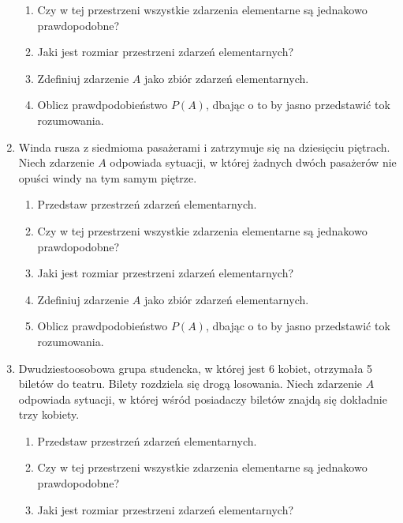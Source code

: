 \documentclass[twoside]{mwart}
\newcommand{\ans}[1]{}
\newcommand{\ans}[1]{\par\emph{Odpowiedź:} #1}
\begin{document}
\begin{enumerate}
\begin{enumerate}
\item Czy w tej przestrzeni wszystkie zdarzenia elementarne są jednakowo prawdopodobne? \ans{Tak}%
\item Jaki jest rozmiar przestrzeni zdarzeń elementarnych? \ans{$\left|\Omega\right|={100\choose 50}$}%
\item Zdefiniuj zdarzenie $A$ jako zbiór zdarzeń elementarnych. \ans{$A=\{\omega_J|\left|J\cap \{1,2,\ldots,5\}\right|\leq 1\}$}%
\item Oblicz prawdpodobieństwo $P(A)$, dbając o to by jasno przedstawić tok rozumowania. \ans{$\left|A\right|={5\choose 1}{95\choose 49}+{95\choose 50}, P(A)\approx0{,}181$}%
\end{enumerate}%
\item Winda rusza z siedmioma pasażerami i zatrzymuje się na dziesięciu piętrach. Niech zdarzenie $A$ odpowiada sytuacji, w której żadnych dwóch pasażerów nie opuści windy na tym samym piętrze.
\begin{enumerate}%
\item Przedstaw przestrzeń zdarzeń elementarnych. \ans{$\Omega=\{\omega_{i_1,\ldots,i_7}|i_j=1,2,\ldots,10\}$}%
\item Czy w tej przestrzeni wszystkie zdarzenia elementarne są jednakowo prawdopodobne? \ans{Tak}%
\item Jaki jest rozmiar przestrzeni zdarzeń elementarnych? \ans{$\left|\Omega\right|=10^7$}%
\item Zdefiniuj zdarzenie $A$ jako zbiór zdarzeń elementarnych. \ans{$A=\{\omega_{i_1,\ldots,i_7}|\forall j,k\colon j\neq k\to i_j\neq i_k\}, \left|A\right|=\frac{10!}{3!}=604800$}%
\item Oblicz prawdpodobieństwo $P(A)$, dbając o to by jasno przedstawić tok rozumowania. \ans{$P(A)=\frac{604800}{10^7}=0{,}06$}%
\end{enumerate}%
\item Dwudziestoosobowa grupa studencka, w której jest 6 kobiet, otrzymała 5 biletów do teatru. Bilety rozdziela się drogą losowania. Niech zdarzenie $A$ odpowiada sytuacji, w której wśród posiadaczy biletów znajdą się dokładnie trzy kobiety.
\begin{enumerate}%
\item Przedstaw przestrzeń zdarzeń elementarnych. \ans{$\Omega=\{\omega_J|\left|J\right|=5 \land J\subset\{1,2,\ldots,20\}\}$}%
\item Czy w tej przestrzeni wszystkie zdarzenia elementarne są jednakowo prawdopodobne? \ans{Tak}%
\item Jaki jest rozmiar przestrzeni zdarzeń elementarnych? \ans{$\left|\Omega\right|={20\choose 5}=15504$}%

\end{enumerate}
\end{enumerate}
\end{document}
